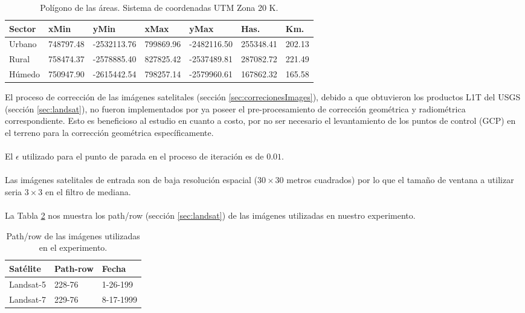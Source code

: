 \begin{table}[H]
	\centering
	\begin{tabular}{|l|l|l|l|l|l|l|}
		\hline
		\rowcolor[HTML]{EFEFEF} 
		\textbf{Sector} & \textbf{xMin} & \textbf{yMin} & \textbf{xMax} & \textbf{yMax} & \textbf{Has.} & \textbf{Km.} \\ \hline
		Urbano          & 748797.48     & -2532113.76   & 799869.96     & -2482116.50 & 255348.41 & 202.13   \\ \hline
		Rural           & 758474.37     & -2578885.40   & 827825.42     & -2537489.81 & 287082.72 & 221.49  \\ \hline
		Húmedo          & 750947.90     & -2615442.54   & 798257.14     & -2579960.61 & 167862.32 & 165.58	  \\ \hline
	\end{tabular}
		\caption{Pol\'igono de las \'areas. Sistema de coordenadas UTM Zona 20 K. }
		\label{t:poligonos}
\end{table}
El proceso de correcci\'on de las im\'agenes satelitales (secci\'on \ref{sec:correcionesImages}), debido a que obtuvieron los productos L1T del USGS (secci\'on \ref{sec:landsat}), no fueron implementados por ya poseer el pre-procesamiento de correcci\'on geom\'etrica y radiom\'etrica correspondiente. Esto es beneficioso al estudio en cuanto a costo, por no ser necesario el levantamiento de los puntos de control (GCP) en el terreno para la correcci\'on geom\'etrica espec\'ificamente.\\~\\
El $ \epsilon $ utilizado para el punto de parada en el proceso de iteraci\'on es de $ 0.01 $.\\~\\
Las im\'agenes satelitales de entrada son de baja resoluci\'on espacial ($ 30 \times 30 $ metros cuadrados) por lo que el tama\~{n}o de ventana a utilizar seria $ 3 \times 3 $ en el filtro de mediana. \\~\\
 La Tabla \ref{t:pathRow} nos muestra los path/row (secci\'on \ref{sec:landsat}) de las im\'agenes utilizadas en nuestro experimento.

\begin{table}[H]
	\centering

	\begin{tabular}{|l|l|l|}
		\hline
		\rowcolor[HTML]{EFEFEF} 
		\textbf{Sat\'elite} & \textbf{Path-row} & \textbf{Fecha}  \\ \hline
		Landsat-5         & 228-76            & 1-26-199       \\ \hline
		Landsat-7         & 229-76            & 8-17-1999      \\ \hline
	\end{tabular}
		\caption{Path/row de las im\'agenes utilizadas en el experimento.}
		\label{t:pathRow}
\end{table}

